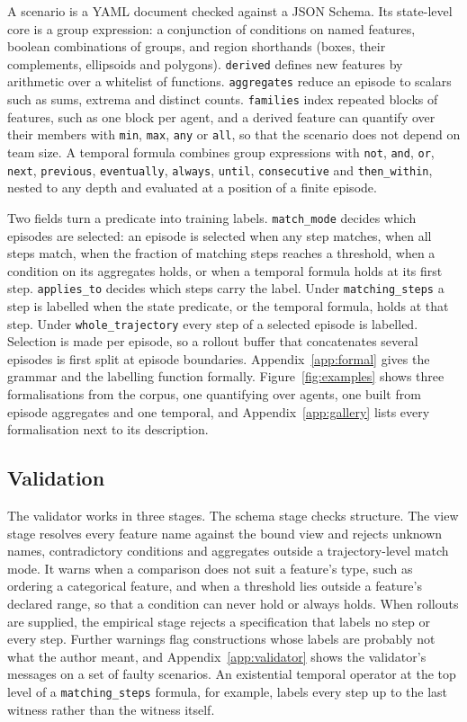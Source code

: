 \documentclass{article}
\begin{document}
A scenario is a YAML document checked against a JSON Schema. Its
state-level core is a group expression: a conjunction of conditions on
named features, boolean combinations of groups, and region shorthands
(boxes, their complements, ellipsoids and polygons). \texttt{derived}
defines new features by arithmetic over a whitelist of functions.
\texttt{aggregates} reduce an episode to scalars such as sums, extrema and
distinct counts. \texttt{families} index repeated blocks of features, such
as one block per agent, and a derived feature can quantify over their
members with \texttt{min}, \texttt{max}, \texttt{any} or \texttt{all}, so
that the scenario does not depend on team size. A temporal formula
combines group expressions with \texttt{not}, \texttt{and}, \texttt{or},
\texttt{next}, \texttt{previous}, \texttt{eventually}, \texttt{always},
\texttt{until}, \texttt{consecutive} and \texttt{then\_within}, nested to
any depth and evaluated at a position of a finite episode.

Two fields turn a predicate into training labels. \texttt{match\_mode}
decides which episodes are selected: an episode is selected when any step
matches, when all steps match, when the fraction of matching steps reaches
a threshold, when a condition on its aggregates holds, or when a temporal
formula holds at its first step. \texttt{applies\_to} decides which steps
carry the label. Under \texttt{matching\_steps} a step is labelled when
the state predicate, or the temporal formula, holds at that step. Under
\texttt{whole\_trajectory} every step of a selected episode is labelled.
Selection is made per episode, so a rollout buffer that concatenates
several episodes is first split at episode boundaries.
Appendix~\ref{app:formal} gives the grammar and the labelling function
formally. Figure~\ref{fig:examples} shows three formalisations from the
corpus, one quantifying over agents, one built from episode aggregates and
one temporal, and Appendix~\ref{app:gallery} lists every formalisation
next to its description.



\subsection{Validation}
\label{sec:validation}

The validator works in three stages. The schema stage checks structure.
The view stage resolves every feature name against the bound view and
rejects unknown names, contradictory conditions and aggregates outside a
trajectory-level match mode. It warns when a comparison does not suit a
feature's type, such as ordering a categorical feature, and when a
threshold lies outside a feature's declared range, so that a condition can
never hold or always holds. When rollouts are supplied, the empirical
stage rejects a specification that labels no step or every step. Further
warnings flag constructions whose labels are probably not what the author
meant, and Appendix~\ref{app:validator} shows the validator's messages on a
set of faulty scenarios.
An existential temporal operator at the top level of a
\texttt{matching\_steps} formula, for example, labels every step up to the
last witness rather than the witness itself.
\end{document}
